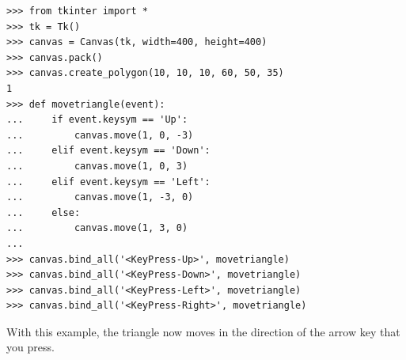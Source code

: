 \begin{Verbatim}[frame=single]
>>> from tkinter import *
>>> tk = Tk()
>>> canvas = Canvas(tk, width=400, height=400)
>>> canvas.pack()
>>> canvas.create_polygon(10, 10, 10, 60, 50, 35)
1
>>> def movetriangle(event):
...     if event.keysym == 'Up':
...         canvas.move(1, 0, -3)
...     elif event.keysym == 'Down':
...         canvas.move(1, 0, 3)
...     elif event.keysym == 'Left':
...         canvas.move(1, -3, 0)
...     else:
...         canvas.move(1, 3, 0)
...
>>> canvas.bind_all('<KeyPress-Up>', movetriangle)
>>> canvas.bind_all('<KeyPress-Down>', movetriangle)
>>> canvas.bind_all('<KeyPress-Left>', movetriangle)
>>> canvas.bind_all('<KeyPress-Right>', movetriangle)
\end{Verbatim}

\noindent
With this example, the triangle now moves in the direction of the arrow key that you press.

\newpage
